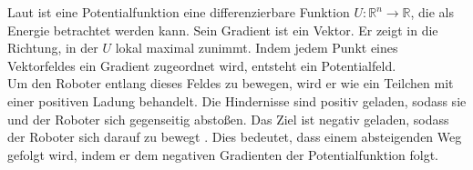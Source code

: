 Laut \cite{Principles:05} ist eine Potentialfunktion eine differenzierbare Funktion $U : \mathbb{R}^{n} \rightarrow \mathbb{R}$, die als Energie betrachtet werden kann. Sein Gradient ist ein Vektor. Er zeigt in die Richtung, in der $U$ lokal maximal zunimmt. Indem jedem Punkt eines Vektorfeldes ein Gradient zugeordnet wird, entsteht ein Potentialfeld.\\
Um den Roboter entlang dieses Feldes zu bewegen, wird er wie ein Teilchen mit einer positiven Ladung behandelt. Die Hindernisse sind positiv geladen, sodass sie und der Roboter sich gegenseitig absto{ß}en. Das Ziel ist negativ geladen, sodass der Roboter sich darauf zu bewegt \cite{Yong:92}. Dies bedeutet, dass einem absteigenden Weg gefolgt wird, indem er dem negativen Gradienten der Potentialfunktion folgt.


